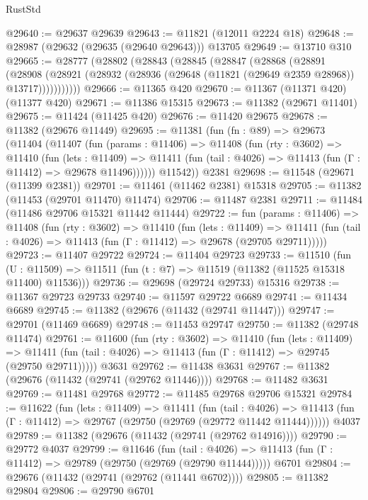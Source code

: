 \begin{lexlean}{RustStd}
\begin{coremodule}
@29640 := @29637 @29639
@29643 := @11821 (@12011 @2224 @18)
@29648 := @28987 (@29632 (@29635 (@29640 @29643))) @13705
@29649 := @13710 @310
@29665 := @28777
    (@28802
      (@28843
        (@28845
          (@28847
            (@28868
              (@28891
                (@28908
                  (@28921 (@28932 (@28936 (@29648 (@11821 (@29649 @2359 @28968)) @13717)))))))))))
@29666 := @11365 @420
@29670 := @11367 (@11371 @420) (@11377 @420)
@29671 := @11386 @15315
@29673 := @11382 (@29671 @11401)
@29675 := @11424 (@11425 @420)
@29676 := @11420 @29675
@29678 := @11382 (@29676 @11449)
@29695 := @11381
    (fun (fn : @89) =>
    @29673
      (@11404
        (@11407
          (fun (params : @11406) =>
          @11408
            (fun (rty : @3602) =>
            @11410
              (fun (lets : @11409) =>
              @11411 (fun (tail : @4026) => @11413 (fun (Γ : @11412) => @29678 @11496))))))
        @11542))
    @2381
@29698 := @11548 (@29671 (@11399 @2381))
@29701 := @11461 (@11462 @2381) @15318
@29705 := @11382 (@11453 (@29701 @11470) @11474)
@29706 := @11487 @2381
@29711 := @11484 (@11486 @29706 @15321 @11442 @11444)
@29722 := fun (params : @11406) =>
  @11408
    (fun (rty : @3602) =>
    @11410
      (fun (lets : @11409) =>
      @11411 (fun (tail : @4026) => @11413 (fun (Γ : @11412) => @29678 (@29705 @29711)))))
@29723 := @11407 @29722
@29724 := @11404 @29723
@29733 := @11510
    (fun (U : @11509) => @11511 (fun (t : @7) => @11519 (@11382 (@11525 @15318 @11400) @11536)))
@29736 := @29698 (@29724 @29733) @15316
@29738 := @11367 @29723 @29733
@29740 := @11597 @29722 @6689
@29741 := @11434 @6689
@29745 := @11382 (@29676 (@11432 (@29741 @11447)))
@29747 := @29701 (@11469 @6689)
@29748 := @11453 @29747
@29750 := @11382 (@29748 @11474)
@29761 := @11600
    (fun (rty : @3602) =>
    @11410
      (fun (lets : @11409) =>
      @11411 (fun (tail : @4026) => @11413 (fun (Γ : @11412) => @29745 (@29750 @29711)))))
    @3631
@29762 := @11438 @3631
@29767 := @11382 (@29676 (@11432 (@29741 (@29762 @11446))))
@29768 := @11482 @3631
@29769 := @11481 @29768
@29772 := @11485 @29768 @29706 @15321
@29784 := @11622
    (fun (lets : @11409) =>
    @11411
      (fun (tail : @4026) =>
      @11413 (fun (Γ : @11412) => @29767 (@29750 (@29769 (@29772 @11442 @11444))))))
    @4037
@29789 := @11382 (@29676 (@11432 (@29741 (@29762 @14916))))
@29790 := @29772 @4037
@29799 := @11646
    (fun (tail : @4026) => @11413 (fun (Γ : @11412) => @29789 (@29750 (@29769 (@29790 @11444)))))
    @6701
@29804 := @29676 (@11432 (@29741 (@29762 (@11441 @6702))))
@29805 := @11382 @29804
@29806 := @29790 @6701

\end{coremodule}
\end{lexlean}
